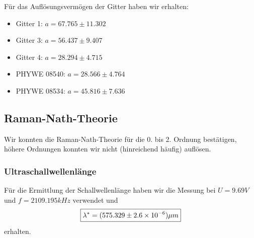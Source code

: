 Für das Auflösungsvermögen der Gitter haben wir erhalten:

\begin{itemize}
\item Gitter 1: $ a = 67.765 \pm 11.302 $
\item Gitter 3: $ a = 56.437 \pm 9.407 $
\item Gitter 4: $ a = 28.294 \pm 4.715 $
\item PHYWE 08540: $ a = 28.566 \pm 4.764 $
\item PHYWE 08534: $ a = 45.816 \pm 7.636 $
\end{itemize}


\subsection{Raman-Nath-Theorie}

Wir konnten die Raman-Nath-Theorie für die 0. bis 2. Ordnung bestätigen, höhere Ordnungen konnten wir nicht (hinreichend häufig) auflösen.

\subsubsection{Ultraschallwellenlänge}

Für die Ermittlung der Schallwellenlänge haben wir die Messung bei $ U = 9.69 V$ und $f = 2109.195 kHz $ verwendet und  
$$\boxed{ \lambda^* = (575.329 \pm 2.6\times 10^{-6}) \mu m}$$
erhalten.
